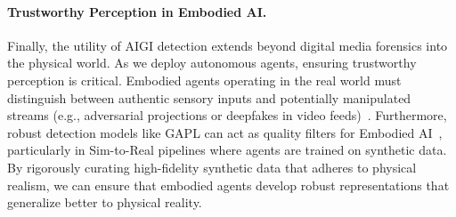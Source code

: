 \paragraph{Trustworthy Perception in Embodied AI.}
Finally, the utility of AIGI detection extends beyond digital media forensics into the physical world. As we deploy autonomous agents, ensuring {trustworthy perception} is critical. Embodied agents operating in the real world must distinguish between authentic sensory inputs and potentially manipulated streams (e.g., adversarial projections or deepfakes in video feeds)~\cite{ji2025enhancing,bai2025alleviating}. Furthermore, robust detection models like GAPL can act as quality filters for {Embodied AI}~\cite{bai2025towards,lyu2025egoprompt,ji2025visualtrans,tan2025roboos}, particularly in Sim-to-Real pipelines where agents are trained on synthetic data. By rigorously curating high-fidelity synthetic data that adheres to physical realism, we can ensure that embodied agents develop robust representations that generalize better to physical reality.



